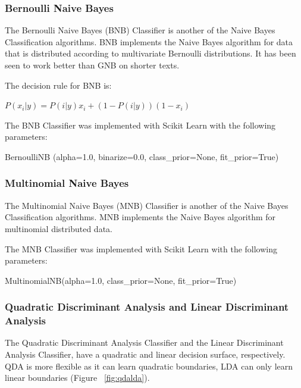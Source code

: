 \subsubsection*{Bernoulli Naive Bayes}

The Bernoulli Naive Bayes (BNB) Classifier is another of the Naive Bayes Classification algorithms. BNB implements the Naive Bayes algorithm for data that is distributed according to multivariate Bernoulli distributions. It has been seen to work better than GNB on shorter texts.

The decision rule for BNB is:
\begin{center}
$P(x_i|y) = P(i|y)x_i + (1 - P(i|y))(1 - x_i)$
\end{center}

The BNB Classifier was implemented with Scikit Learn with the following parameters:

\begin{tcolorbox}
\begin{center}
	BernoulliNB (alpha=1.0, binarize=0.0, class\_prior=None, fit\_prior=True)
\end{center}
\end{tcolorbox}

\subsubsection*{Multinomial Naive Bayes}

The Multinomial Naive Bayes (MNB) Classifier is another of the Naive Bayes Classification algorithms. MNB implements the Naive Bayes algorithm for multinomial distributed data.

The MNB Classifier was implemented with Scikit Learn with the following parameters:

\begin{tcolorbox}
\begin{center}
	MultinomialNB(alpha=1.0, class\_prior=None, fit\_prior=True)
\end{center}
\end{tcolorbox}

\subsubsection*{Quadratic Discriminant Analysis and Linear Discriminant Analysis}

The Quadratic Discriminant Analysis Classifier and the Linear Discriminant Analysis Classifier, have a quadratic and linear decision surface, respectively. QDA is more flexible as it can learn quadratic boundaries, LDA can only learn linear boundaries (Figure ~\ref{fig:qdalda}). 

